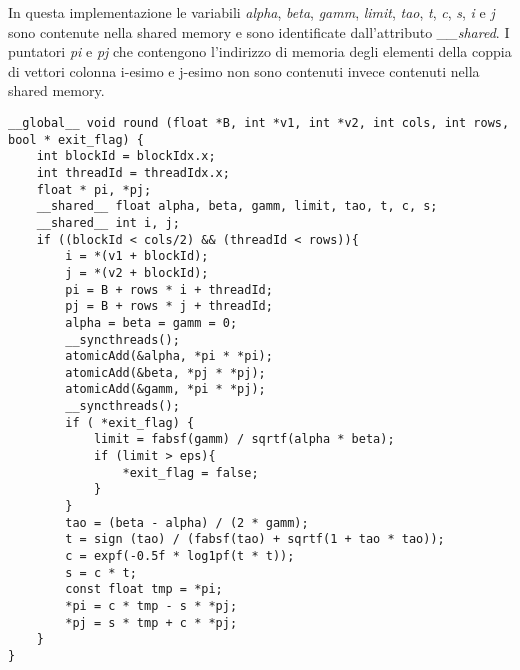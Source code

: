 \label{sec:Semi_Shared}
In questa implementazione le variabili \textit{alpha}, \textit{beta}, \textit{gamm}, \textit{limit}, \textit{tao}, \textit{t}, \textit{c}, \textit{s}, \textit{i} e \textit{j} sono contenute nella shared memory e sono identificate dall'attributo \textit{\_\_shared}. I puntatori \textit{pi} e \textit{pj} che contengono l'indirizzo di memoria degli elementi della coppia di vettori colonna i-esimo e j-esimo non sono contenuti invece contenuti nella shared memory.
\begin{lstlisting}
__global__ void round (float *B, int *v1, int *v2, int cols, int rows, bool * exit_flag) {
	int blockId = blockIdx.x;
	int threadId = threadIdx.x;
	float * pi, *pj;
	__shared__ float alpha, beta, gamm, limit, tao, t, c, s;
	__shared__ int i, j;
	if ((blockId < cols/2) && (threadId < rows)){
		i = *(v1 + blockId);
		j = *(v2 + blockId);
		pi = B + rows * i + threadId;
		pj = B + rows * j + threadId;
		alpha = beta = gamm = 0;
		__syncthreads();
		atomicAdd(&alpha, *pi * *pi);
		atomicAdd(&beta, *pj * *pj);	
		atomicAdd(&gamm, *pi * *pj);
		__syncthreads();
		if ( *exit_flag) {
			limit = fabsf(gamm) / sqrtf(alpha * beta);
			if (limit > eps){
				*exit_flag = false;
			}
		} 
		tao = (beta - alpha) / (2 * gamm);
		t = sign (tao) / (fabsf(tao) + sqrtf(1 + tao * tao)); 
		c = expf(-0.5f * log1pf(t * t));
		s = c * t;
		const float tmp = *pi;
		*pi = c * tmp - s * *pj;
		*pj = s * tmp + c * *pj;
	}
}
\end{lstlisting}